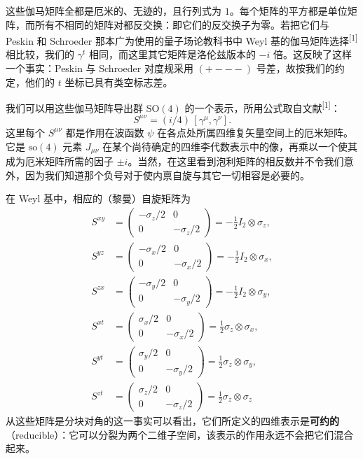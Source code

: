 这些伽马矩阵全都是厄米的、无迹的，且行列式为 $1$。每个矩阵的平方都是单位矩阵，而所有不相同的矩阵对都反交换：即它们的反交换子为零。若把它们与 Peskin 和 Schroeder 那本广为使用的量子场论教科书中 Weyl 基的伽马矩阵选择\textsuperscript{[1]}相比较，我们的 $\gamma^{t}$ 相同，而这里其它矩阵是洛伦兹版本的 $-i$ 倍。这反映了这样一个事实：Peskin 与 Schroeder 对度规采用 $(+---)$ 号差，故按我们的约定，他们的 $t$ 坐标已具有类空标志差。

我们可以用这些伽马矩阵导出群 $\mathrm{SO}(4)$ 的一个表示，所用公式取自文献\textsuperscript{[1]}：
\begin{equation}
S^{\mu\nu}=(i/4)\,[\gamma^{\mu},\gamma^{\nu}].
\end{equation}
这里每个 $S^{\mu\nu}$ 都是作用在波函数 $\psi$ 在各点处所属四维复矢量空间上的厄米矩阵。它是 $\mathrm{so}(4)$ 元素 $J_{\mu\nu}$ 在某个尚待确定的四维李代数表示中的像，再乘以一个使其成为厄米矩阵所需的因子 $\pm i$。当然，在这里看到泡利矩阵的相反数并不令我们意外，因为我们知道那个负号对于使内禀自旋与其它一切相容是必要的。

在 Weyl 基中，相应的（黎曼）自旋矩阵为
\begin{align}
S^{xy} &=
\begin{pmatrix}-\sigma_{z}/2&0\\ 0&-\sigma_{z}/2\end{pmatrix}
=-\tfrac12 I_{2}\otimes\sigma_{z}, \nonumber\\
S^{yz} &=
\begin{pmatrix}-\sigma_{x}/2&0\\ 0&-\sigma_{x}/2\end{pmatrix}
=-\tfrac12 I_{2}\otimes\sigma_{x}, \nonumber\\
S^{zx} &=
\begin{pmatrix}-\sigma_{y}/2&0\\ 0&-\sigma_{y}/2\end{pmatrix}
=-\tfrac12 I_{2}\otimes\sigma_{y}, \nonumber\\
S^{xt} &=
\begin{pmatrix}\sigma_{x}/2&0\\ 0&-\sigma_{x}/2\end{pmatrix}
=\tfrac12\sigma_{z}\otimes\sigma_{x}, \nonumber\\
S^{yt} &=
\begin{pmatrix}\sigma_{y}/2&0\\ 0&-\sigma_{y}/2\end{pmatrix}
=\tfrac12\sigma_{z}\otimes\sigma_{y}, \nonumber\\
S^{zt} &=
\begin{pmatrix}\sigma_{z}/2&0\\ 0&-\sigma_{z}/2\end{pmatrix}
=\tfrac12\sigma_{z}\otimes\sigma_{z}
\tag{Riemannian}
\end{align}
从这些矩阵是分块对角的这一事实可以看出，它们所定义的四维表示是\textbf{可约的}（reducible）：它可以分裂为两个二维子空间，该表示的作用永远不会把它们混合起来。

